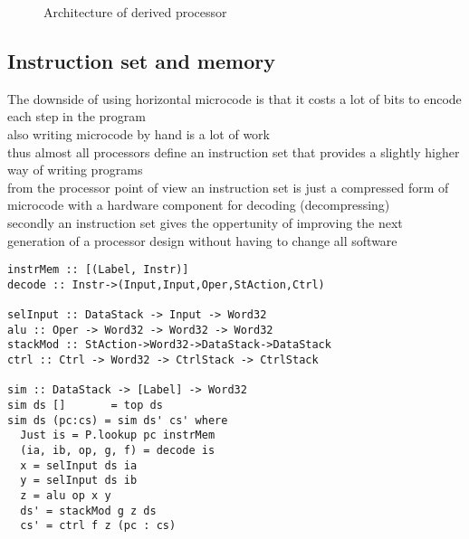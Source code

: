 \documentclass[preprint]{sigplanconf}
\begin{document}
\begin{figure}
\caption{Architecture of derived processor}
\end{figure}

\subsection{Instruction set and memory}

The downside of using horizontal microcode is that it costs a lot of bits to encode each step in the program \\
also writing microcode by hand is a lot of work \\
thus almost all processors define an instruction set that provides a slightly higher way of writing programs \\
from the processor point of view an instruction set is just a compressed form of microcode with a hardware component for decoding (decompressing) \\
secondly an instruction set gives the oppertunity of improving the next generation of a processor design without having to change all software

\begin{lstlisting}
instrMem :: [(Label, Instr)]
decode :: Instr->(Input,Input,Oper,StAction,Ctrl)

selInput :: DataStack -> Input -> Word32
alu :: Oper -> Word32 -> Word32 -> Word32
stackMod :: StAction->Word32->DataStack->DataStack
ctrl :: Ctrl -> Word32 -> CtrlStack -> CtrlStack

sim :: DataStack -> [Label] -> Word32
sim ds []       = top ds
sim ds (pc:cs) = sim ds' cs' where
  Just is = P.lookup pc instrMem
  (ia, ib, op, g, f) = decode is
  x = selInput ds ia
  y = selInput ds ib
  z = alu op x y 
  ds' = stackMod g z ds
  cs' = ctrl f z (pc : cs)

\end{lstlisting}
\end{document}
